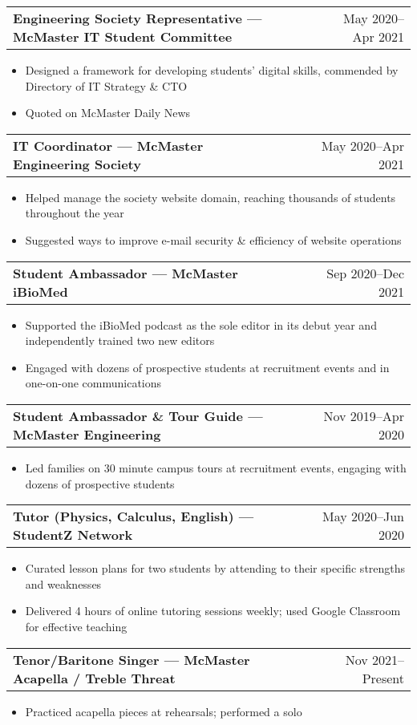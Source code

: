 \documentclass[a4paper,12pt]{article}
\makeatletter
\newenvironment{joblong}[2]
    {
    \begin{tabularx}{\linewidth}{@{}l X r@{}}
    \textbf{#1} & \hfill &  #2 \\[3.75pt]
    \end{tabularx}
    \begin{minipage}[t]{\linewidth}
    \begin{itemize}[nosep,after=\strut, leftmargin=1em, itemsep=3pt,label=--]
    }
    {
    \end{itemize}
    \end{minipage}    
    }
\makeatother
\begin{document}
\begin{joblong}{Engineering Society Representative — McMaster IT Student Committee}{May 2020--Apr 2021}
\item Designed a framework for developing students' digital skills, commended by Directory of IT Strategy \& CTO
\item Quoted on McMaster Daily News
\end{joblong}

\begin{joblong}{IT Coordinator — McMaster Engineering Society}{May 2020--Apr 2021}
\item Helped manage the society website domain, reaching thousands of students throughout the year
\item Suggested ways to improve e-mail security \& efficiency of website operations
\end{joblong}

\begin{joblong}{Student Ambassador — McMaster iBioMed}{Sep 2020--Dec 2021}
\item Supported the iBioMed podcast as the sole editor in its debut year and independently trained two new editors
\item Engaged with dozens of prospective students at recruitment events and in one-on-one communications
\end{joblong}

\begin{joblong}{Student Ambassador \& Tour Guide — McMaster Engineering}{Nov 2019--Apr 2020}
\item Led families on 30 minute campus tours at recruitment events, engaging with dozens of prospective students
\end{joblong}

\begin{joblong}{Tutor (Physics, Calculus, English) — StudentZ Network}{May 2020--Jun 2020}
\item Curated lesson plans for two students by attending to their specific strengths and weaknesses
\item Delivered 4 hours of online tutoring sessions weekly; used Google Classroom for effective teaching
\end{joblong}

\begin{joblong}{Tenor/Baritone Singer — McMaster Acapella / Treble Threat}{Nov 2021--Present}
\item Practiced acapella pieces at rehearsals; performed a solo
\end{joblong}
\end{document}
